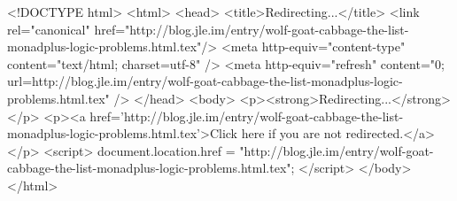 <!DOCTYPE html>
<html>
<head>
<title>Redirecting...</title>
<link rel="canonical" href="http://blog.jle.im/entry/wolf-goat-cabbage-the-list-monadplus-logic-problems.html.tex"/>
<meta http-equiv="content-type" content="text/html; charset=utf-8" />
<meta http-equiv="refresh" content="0; url=http://blog.jle.im/entry/wolf-goat-cabbage-the-list-monadplus-logic-problems.html.tex" />
</head>
<body>
  <p><strong>Redirecting...</strong></p>
  <p><a href='http://blog.jle.im/entry/wolf-goat-cabbage-the-list-monadplus-logic-problems.html.tex'>Click here if you are not redirected.</a></p>
  <script>
    document.location.href = "http://blog.jle.im/entry/wolf-goat-cabbage-the-list-monadplus-logic-problems.html.tex";
  </script>
</body>
</html>
